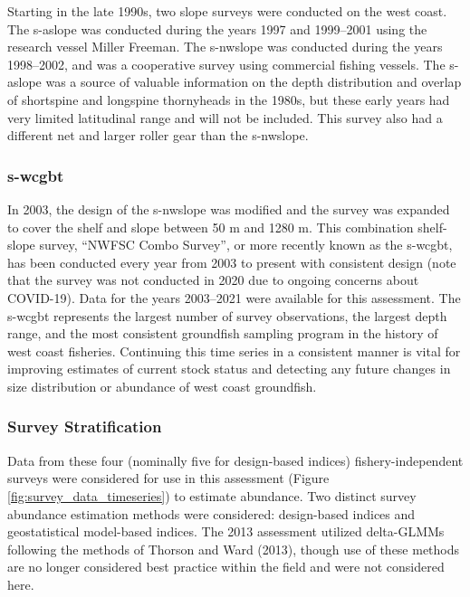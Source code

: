 \documentclass[11pt,
  english,
  letterpaper,
]{article}
\begin{document}
Starting in the late 1990s, two slope surveys were conducted on the west coast. The \gls{s-aslope} was conducted during the years 1997 and 1999--2001 using the research vessel Miller Freeman. The \gls{s-nwslope} was conducted during the years 1998--2002, and was a cooperative survey using commercial fishing vessels. The \gls{s-aslope} was a source of valuable information on the depth distribution and overlap of shortspine and longspine thornyheads in the 1980s, but these early years had very limited latitudinal range and will not be included. This survey also had a different net and larger roller gear than the \gls{s-nwslope}.

\hypertarget{section-1}{%
\subsubsection{\texorpdfstring{\acrlong{s-wcgbt}}{}}\label{section-1}}

In 2003, the design of the \gls{s-nwslope} was modified and the survey was expanded to cover the shelf and slope between 50 m and 1280 m. This combination shelf-slope survey, ``NWFSC Combo Survey'', or more recently known as the \gls{s-wcgbt}, has been conducted every year from 2003 to present with consistent design (note that the survey was not conducted in 2020 due to ongoing concerns about COVID-19). Data for the years 2003--2021 were available for this assessment. The \gls{s-wcgbt} represents the largest number of survey observations, the largest depth range, and the most consistent groundfish sampling program in the history of west coast fisheries. Continuing this time series in a consistent manner is vital for improving estimates of current stock status and detecting any future changes in size distribution or abundance of west coast groundfish.

\hypertarget{survey-stratification}{%
\subsubsection{Survey Stratification}\label{survey-stratification}}

Data from these four (nominally five for design-based indices) fishery-independent surveys were considered for use in this assessment (Figure \ref{fig:survey_data_timeseries}) to estimate abundance. Two distinct survey abundance estimation methods were considered: design-based indices and geostatistical model-based indices. The 2013 assessment utilized delta-GLMMs following the methods of Thorson and Ward (2013), though use of these methods are no longer considered best practice within the field and were not considered here.
\end{document}
